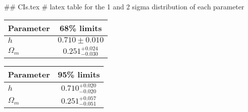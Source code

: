 ## CIs.tex
# latex table for the 1 and 2 sigma distribution of each parameter

\begin{tabular} { l  c}
 Parameter &  68\% limits\\
\hline
{\boldmath$h              $} & $0.710\pm 0.010            $\\
{\boldmath$\Omega_m       $} & $0.251^{+0.024}_{-0.030}   $\\
\hline
\end{tabular}

\begin{tabular} { l  c}
 Parameter &  95\% limits\\
\hline
{\boldmath$h              $} & $0.710^{+0.020}_{-0.020}   $\\
{\boldmath$\Omega_m       $} & $0.251^{+0.057}_{-0.051}   $\\
\hline
\end{tabular}
